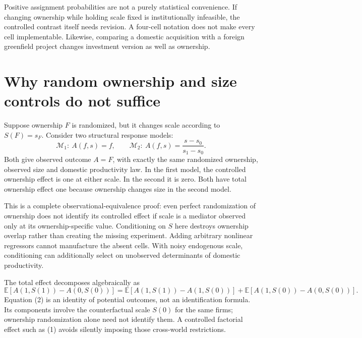 \documentclass[11pt,a4paper]{article}
\newcommand{\E}{\mathbb E}
\begin{document}
Positive assignment probabilities are not a purely statistical convenience. If changing ownership while holding scale fixed is institutionally infeasible, the controlled contrast itself needs revision. A four-cell notation does not make every cell implementable. Likewise, comparing a domestic acquisition with a foreign greenfield project changes investment version as well as ownership.

\section{Why random ownership and size controls do not suffice}
Suppose ownership $F$ is randomized, but it changes scale according to $S(F)=s_F$. Consider two structural response models:
\[
 \mathcal M_1:\ A(f,s)=f,\qquad
 \mathcal M_2:\ A(f,s)=\frac{s-s_0}{s_1-s_0}.
\]
Both give observed outcome $A=F$, with exactly the same randomized ownership, observed size and domestic productivity law. In the first model, the controlled ownership effect is one at either scale. In the second it is zero. Both have total ownership effect one because ownership changes size in the second model.

This is a complete observational-equivalence proof: even perfect randomization of ownership does not identify its controlled effect if scale is a mediator observed only at its ownership-specific value. Conditioning on $S$ here destroys ownership overlap rather than creating the missing experiment. Adding arbitrary nonlinear regressors cannot manufacture the absent cells. With noisy endogenous scale, conditioning can additionally select on unobserved determinants of domestic productivity.

The total effect decomposes algebraically as
\[
 \E[A(1,S(1))-A(0,S(0))]
 =\E[A(1,S(1))-A(1,S(0))]
  +\E[A(1,S(0))-A(0,S(0))]. \tag{2}
\]
Equation (2) is an identity of potential outcomes, not an identification formula. Its components involve the counterfactual scale $S(0)$ for the same firms; ownership randomization alone need not identify them. A controlled factorial effect such as (1) avoids silently imposing those cross-world restrictions.
\end{document}
